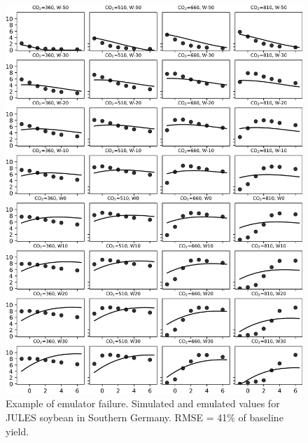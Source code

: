 \documentclass[10pt]{article}
\begin{document}
\begin{figure}[h!]
\includegraphics[width=\textwidth]{jules_soy_bad.png}
\caption{Example of emulator failure. Simulated and emulated values for JULES soybean in Southern Germany. RMSE = 41\% of baseline yield.}
\label{fig:lpjmlrice}
\end{figure}
\end{document}
